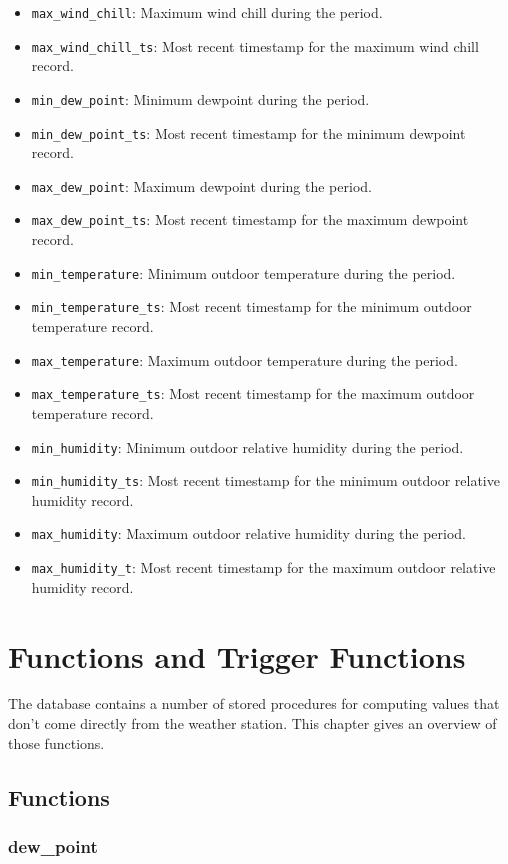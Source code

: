 \documentclass[a4paper,10pt]{book}
\begin{document}
\begin{itemize}
\item \verb|max_wind_chill|: Maximum wind chill during the period.
\item \verb|max_wind_chill_ts|: Most recent timestamp for the maximum wind chill record.
\item \verb|min_dew_point|: Minimum dewpoint during the period.
\item \verb|min_dew_point_ts|: Most recent timestamp for the minimum dewpoint record.
\item \verb|max_dew_point|: Maximum dewpoint during the period.
\item \verb|max_dew_point_ts|: Most recent timestamp for the maximum dewpoint record.
\item \verb|min_temperature|: Minimum outdoor temperature during the period.
\item \verb|min_temperature_ts|: Most recent timestamp for the minimum outdoor temperature record.
\item \verb|max_temperature|: Maximum outdoor temperature during the period.
\item \verb|max_temperature_ts|: Most recent timestamp for the maximum outdoor temperature record.
\item \verb|min_humidity|: Minimum outdoor relative humidity during the period.
\item \verb|min_humidity_ts|: Most recent timestamp for the minimum outdoor relative humidity record.
\item \verb|max_humidity|: Maximum outdoor relative humidity during the period.
\item \verb|max_humidity_t|: Most recent timestamp for the maximum outdoor relative humidity record.
\end{itemize}

\chapter{Functions and Trigger Functions}
\label{cha_functions}

The database contains a number of stored procedures for computing values that don't come directly from the weather station. This chapter gives an overview of those functions.

\section{Functions}
\label{functions}
\subsection{dew\_point}
\label{dew_point}
\end{document}

